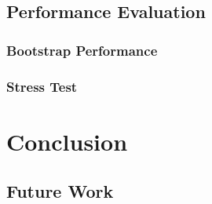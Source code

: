 \fi


\section{Performance Evaluation}

\subsection{Bootstrap Performance}

\subsection{Stress Test}



\chapter{Conclusion}

\section{Future Work}
